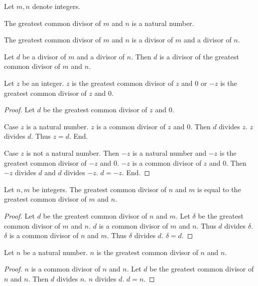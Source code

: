 \documentclass{article}
\begin{document}
\begin{forthel}

Let $m,n$ denote integers.


\begin{signature}
The greatest common divisor of $m$ and $n$ is a natural number.
\end{signature}

\begin{axiom}
The greatest common divisor of $m$ and $n$ is a divisor of $m$ and a divisor of $n$.
\end{axiom}

\begin{axiom}
Let $d$ be a divisor of $m$ and a divisor of $n$.
Then $d$ is a divisor of the greatest common divisor of $m$ and $n$.
\end{axiom}


\begin{lemma}
Let $z$ be an integer.
$z$ is the greatest common divisor of $z$ and $0$ or $-z$ is the greatest common divisor of $z$ and $0$.
\end{lemma}
\begin{proof}
Let $d$ be the greatest common divisor of $z$ and $0$.

Case $z$ is a natural number. $z$ is a common divisor of $z$ and $0$. 
  Then $d$ divides $z$. $z$ divides $d$. Thus $z = d$. End.
  
Case $z$ is not a natural number. Then $-z$ is a natural number and $-z$ is the greatest common divisor of $-z$ and $0$.
  $-z$ is a common divisor of $z$ and $0$. Then $-z$ divides $d$ and $d$ divides $-z$. $d = -z$.
End.
\end{proof}


\begin{lemma}
Let $n,m$ be integers. The greatest common divisor of $n$ and $m$ is equal to
the greatest common divisor of $m$ and $n$.
\end{lemma}
\begin{proof}
Let $d$ be the greatest common divisor of $n$ and $m$.
Let $\delta$ be the greatest common divisor of $m$ and $n$.
$d$ is a common divisor of $m$ and $n$. Thus $d$ divides $\delta$. 
$\delta$ is a common divisor of $n$ and $m$. Thus $\delta$ divides $d$. $\delta = d$.
\end{proof}

\begin{lemma}
Let $n$ be a natural number.
$n$ is the greatest common divisor of $n$ and $n$.
\end{lemma}
\begin{proof}
$n$ is a common divisor of $n$ and $n$. Let $d$ be the greatest common divisor of $n$ and $n$.
Then $d$ divides $n$. $n$ divides $d$. $d = n$.
\end{proof}

\end{forthel}
\end{document}
